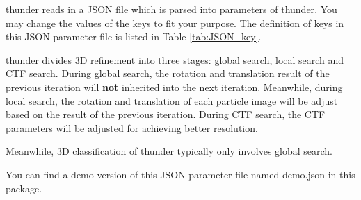 \documentclass{article}
\begin{document}
            \textsf{thunder} reads in a JSON file which is parsed into parameters of \textsf{thunder}. You may change the values of the keys to fit your purpose. The definition of keys in this JSON parameter file is listed in Table \ref{tab:JSON_key}.
            
            \textsf{thunder} divides 3D refinement into three stages: global search, local search and CTF search. During global search, the rotation and translation result of the previous iteration will \textbf{not} inherited into the next iteration. Meanwhile, during local search, the rotation and translation of each particle image will be adjust based on the result of the previous iteration. During CTF search, the CTF parameters will be adjusted for achieving better resolution.
            
            Meanwhile, 3D classification of \textsf{thunder} typically only involves global search.
                        
            You can find a demo version of this JSON parameter file named \textsf{demo.json} in this package.
        
\end{document}
